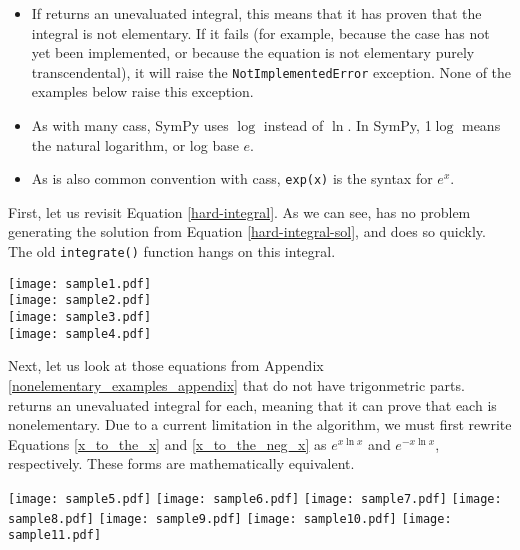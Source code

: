 \begin{itemize}
\item If \rischintegrate{} returns an unevaluated integral, this means
that it has proven that the integral is not \gls{elementary}.  If it
fails (for example, because the case has not yet been implemented, or
because the equation is not \gls{elementary} purely
\gls{transcendental}), it will raise the \texttt{NotImplementedError}
exception.  None of the examples below raise this exception.

\item As with many \glspl{cas}, SymPy uses $\log$ instead of $\ln$. 
In SymPy, 1$\log$ means the natural logarithm, or log base $e$.

\item As is also common convention with \glspl{cas}, \texttt{exp(x)} is
the syntax for $e^x$.
\end{itemize}

First, let us revisit Equation \ref{hard-integral}.  As we can see,
\rischintegrate{} has no problem generating the solution from Equation
\ref{hard-integral-sol}, and does so quickly.  The old
\texttt{integrate()} function hangs on this integral.

\begin{flushleft}
\texttt{[image: sample1.pdf]}\\
\texttt{[image: sample2.pdf]}\\
\texttt{[image: sample3.pdf]}\\
\texttt{[image: sample4.pdf]}
\end{flushleft}

Next, let us look at those equations from Appendix
\ref{nonelementary_examples_appendix} that do not have
trigonmetric parts.  \rischintegrate{} returns an unevaluated integral for
each, meaning that it can prove that each is nonelementary.  Due to a
current limitation in the algorithm, we must first rewrite Equations
\ref{x_to_the_x} and \ref{x_to_the_neg_x} as $e^{x\ln{x}}$ and
$e^{-x\ln{x}}$, respectively.  These forms are mathematically equivalent.

\begin{flushleft}
\texttt{[image: sample5.pdf]}
\texttt{[image: sample6.pdf]}
\texttt{[image: sample7.pdf]}
\texttt{[image: sample8.pdf]}
\texttt{[image: sample9.pdf]}
\texttt{[image: sample10.pdf]}
\texttt{[image: sample11.pdf]}
\end{flushleft}

